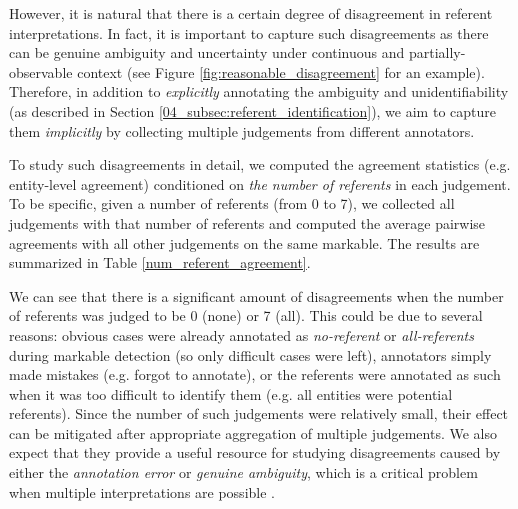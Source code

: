 However, it is natural that there is a certain degree of disagreement in referent interpretations. In fact, it is important to capture such disagreements as there can be genuine ambiguity and uncertainty under continuous and partially-observable context (see Figure \ref{fig:reasonable_disagreement} for an example). Therefore, in addition to \textit{explicitly} annotating the ambiguity and unidentifiability (as described in Section \ref{04_subsec:referent_identification}), we aim to capture them \textit{implicitly} by collecting multiple judgements from different annotators.

To study such disagreements in detail, we computed the agreement statistics (e.g. entity-level agreement) conditioned on \textit{the number of referents} in each judgement. To be specific, given a number of referents (from 0 to 7), we collected all judgements with that number of referents and computed the average pairwise agreements with all other judgements on the same markable. The results are summarized in Table \ref{num_referent_agreement}.

\begin{table}[t!]
\centering {}
\caption{\label{num_referent_agreement}
Agreement statistics conditioned on the number of referents (and the percentages of such judgements).
}
\end{table}

We can see that there is a significant amount of disagreements when the number of referents was judged to be 0 (none) or 7 (all). This could be due to several reasons: obvious cases were already annotated as \textit{no-referent} or \textit{all-referents} during markable detection (so only difficult cases were left), annotators simply made mistakes (e.g. forgot to annotate), or the referents were annotated as such when it was too difficult to identify them (e.g. all entities were potential referents). Since the number of such judgements were relatively small, their effect can be mitigated after appropriate aggregation of multiple judgements. We also expect that they provide a useful resource for studying disagreements caused by either the \textit{annotation error} or \textit{genuine ambiguity}, which is a critical problem when multiple interpretations are possible \citep{poesio-etal-2019-crowdsourced}.

